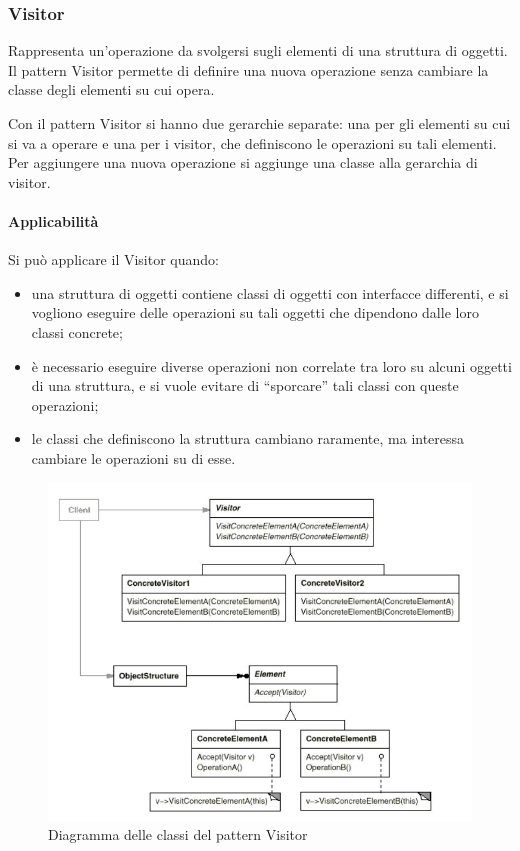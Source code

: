 \subsubsection{Visitor}
\label{ssub:visitor}

Rappresenta un'operazione da svolgersi sugli elementi di una struttura di
oggetti. Il pattern Visitor permette di definire una nuova operazione senza
cambiare la classe degli elementi su cui opera.

Con il pattern Visitor si hanno due gerarchie separate: una per gli elementi su
cui si va a operare e una per i visitor, che definiscono le operazioni su tali
elementi. Per aggiungere una nuova operazione si aggiunge una classe alla
gerarchia di visitor.

\paragraph{Applicabilità}
\label{par:applicabilit_}

Si può applicare il Visitor quando:

\begin{itemize}
  \item una struttura di oggetti contiene classi di oggetti con interfacce
  differenti, e si vogliono eseguire delle operazioni su tali oggetti che
  dipendono dalle loro classi concrete;
  \item è necessario eseguire diverse operazioni non correlate tra loro su
  alcuni oggetti di una struttura, e si vuole evitare di ``sporcare'' tali
  classi con queste operazioni;
  \item le classi che definiscono la struttura cambiano raramente, ma interessa
  cambiare le operazioni su di esse.
\end{itemize}

\begin{figure}[h!]
  \centering
  \includegraphics[scale=0.5]{imgs/visitor}
  \caption{Diagramma delle classi del pattern Visitor}
\end{figure}

